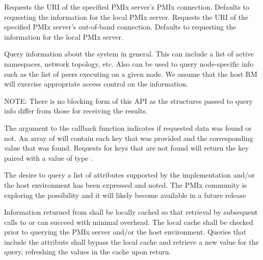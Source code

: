  Requests the URI of the specified \ac{PMIx} server's \ac{PMIx} connection. Defaults to requesting the information for the local \ac{PMIx} server.
\pastePRRTEAttributeItemEnd
{} Requests the URI of the specified \ac{PMIx} server's out-of-band connection. Defaults to requesting the information for the local \ac{PMIx} server.
\pastePRRTEAttributeItemEnd

\optattrend

\descr

Query information about the system in general.
This can include a list of active namespaces, network topology, etc.
Also can be used to query node-specific info such as the list of peers executing on a given node.
We assume that the host \ac{RM} will exercise appropriate access control on the information.

NOTE: There is no blocking form of this API as the structures passed to query info differ from those for receiving the results.

The  argument to the callback function indicates if requested data was found or not.
An array of  will contain each key that was provided and the corresponding value that was found. Requests for keys that are not found will return the key paired with a value of type .

\adviceuserstart
The desire to query a list of attributes supported by the implementation and/or the host environment has been expressed and noted. The \ac{PMIx} community is exploring the possibility and it will likely become available in a future release
\adviceuserend

\adviceimplstart
Information returned from  shall be locally cached so that retrieval by subsequent calls to  or  can succeed with minimal overhead. The local cache shall be checked prior to querying the \ac{PMIx} server and/or the host environment. Queries that include the  attribute shall bypass the local cache and retrieve a new value for the query, refreshing the values in the cache upon return.
\adviceimplend

